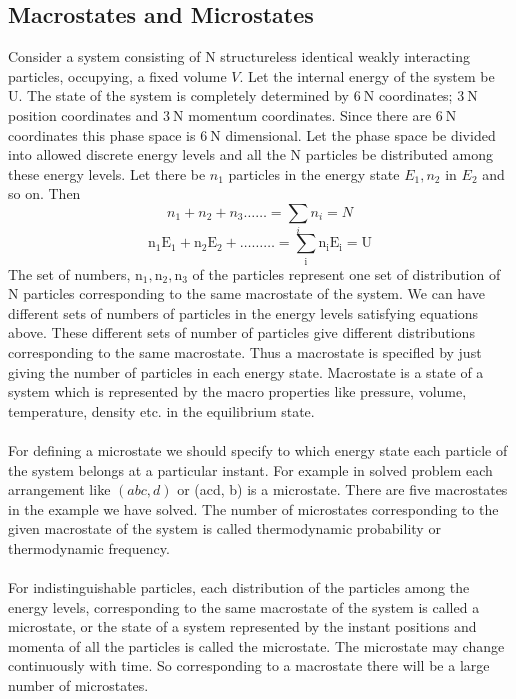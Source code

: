 \subsection{Macrostates and Microstates}
\par Consider a system consisting of $\mathrm{N}$ structureless identical weakly interacting particles, occupying, a fixed volume $V$. Let the internal energy of the system be U. The state of the system is completely determined by $6 \mathrm{~N}$ coordinates; $3 \mathrm{~N}$ position coordinates and $3 \mathrm{~N}$ momentum coordinates. Since there are $6 \mathrm{~N}$ coordinates this phase space is $6 \mathrm{~N}$ dimensional. Let the phase space be divided into allowed discrete energy levels and all the $\mathrm{N}$ particles be distributed among these energy levels. Let there be $n_{1}$ particles in the energy state $E_{1}, n_{2}$ in $E_{2}$ and so on. Then
$$n_{1}+n_{2}+n_{3} \ldots \ldots=\sum_{i} n_{i}=N$$
$$\mathrm{n}_{1} \mathrm{E}_{1}+\mathrm{n}_{2} \mathrm{E}_{2}+\ldots \ldots \ldots=\sum_{\mathrm{i}} \mathrm{n}_{\mathrm{i}} \mathrm{E}_{\mathrm{i}}=\mathrm{U}$$
 The set of numbers, $\mathrm{n}_{1}, \mathrm{n}_{2}, \mathrm{n}_{3}$ of the particles represent one set of distribution of $\mathrm{N}$ particles corresponding to the same macrostate of the system. We can have different sets of numbers of particles in the energy levels satisfying equations above. These different sets of number of particles give different distributions corresponding to the same macrostate. Thus a macrostate is specifled by just giving the number of particles in each energy state. Macrostate is a state of a system which is represented by the macro properties like pressure, volume, temperature, density etc. in the equilibrium state.\\\\
For defining a microstate we should specify to which energy state each particle of the system belongs at a particular instant. For example in solved problem each arrangement like $(a b c, d)$ or (acd, b) is a microstate. There are five macrostates in the example we have solved. The number of microstates corresponding to the given macrostate of the system is called thermodynamic probability or thermodynamic frequency.\\\\
For indistinguishable particles, each distribution of the particles among the energy levels, corresponding to the same macrostate of the system is called a microstate, or the state of a system represented by the instant positions and momenta of all the particles is called the microstate. The microstate may change continuously with time. So corresponding to a macrostate there will be a large number of microstates.
